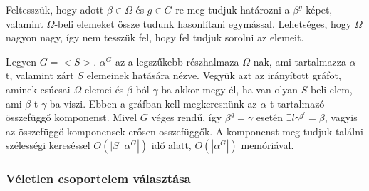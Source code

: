 Feltesszük, hogy adott $\beta\in\Omega$ és $g\in G$-re meg tudjuk határozni a $\beta^g$ képet, valamint $\Omega$-beli
elemeket össze tudunk hasonlítani egymással. Lehetséges, hogy $\Omega$ nagyon nagy, így nem tesszük fel, hogy fel tudjuk sorolni az elemeit.

Legyen $G=<S>$. $\alpha^G$ az a legszűkebb részhalmaza $\Omega$-nak, ami tartalmazza $\alpha$-t, valamint zárt $S$ elemeinek hatására nézve.
Vegyük azt az irányított gráfot, aminek csúcsai $\Omega$ elemei és $\beta$-ból $\gamma$-ba akkor megy él, ha van olyan $S$-beli elem, ami $\beta$-t $\gamma$-ba viszi.
Ebben a gráfban kell megkeresnünk az $\alpha$-t tartalmazó összefüggő komponenst.
Mivel $G$ véges rendű, így $\beta^g=\gamma$ esetén $\exists l \gamma^{g^l}=\beta$, vagyis az összefüggő komponensek erősen osszefüggők.
A komponenst meg tudjuk találni szélességi kereséssel $O(|S| |\alpha^G|)$ idő alatt, $O(|\alpha^G|)$ memóriával.

\subsubsection{Véletlen csoportelem választása}
\label{subsubsec:veletlen}